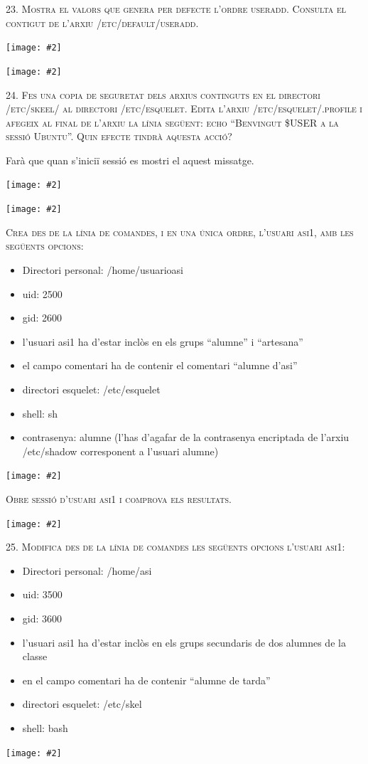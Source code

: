 \documentclass[a4paper,12pt]{article}
\newcommand{\mygraphic}[2][width=\textwidth]{\begin{center}
		\centering\texttt{[image: \#2]}\par
\end{center}}
\begin{document}
\newpage
\textsc{23. Mostra el valors que genera per defecte l’ordre useradd. Consulta el contigut de l’arxiu /etc/default/useradd. }
\mygraphic{imatges/23a.png}
\mygraphic{imatges/23b.png}

\newpage
\textsc{24. Fes una copia de seguretat dels arxius continguts en el directori /etc/skeel/ al directori /etc/esquelet. Edita l’arxiu \linebreak /etc/esquelet/.profile i afegeix al final de l’arxiu la línia següent: echo “Benvingut \$USER a la sessió Ubuntu”. Quin efecte tindrà aquesta acció?}

Farà que quan s'iniciï sessió es mostri el aquest missatge.

\mygraphic{imatges/24a.png}
\mygraphic{imatges/24b.png}


\textsc{Crea des de la línia de comandes, i en una única ordre, l’usuari asi1, amb les següents opcions:}

\begin{itemize}
\item Directori personal: /home/usuarioasi
\item uid: 2500
\item gid: 2600
\item l’usuari asi1 ha d’estar inclòs en els grups “alumne” i “artesana”
\item el campo comentari ha de contenir el comentari “alumne d’asi”
\item directori esquelet: /etc/esquelet
\item shell: sh
\item contrasenya: alumne (l’has d’agafar de la contrasenya encriptada de l’arxiu /etc/shadow corresponent a l’usuari alumne) 
\end{itemize}

\mygraphic{imatges/24c.png}

\newpage
\textsc{Obre sessió d’usuari asi1 i comprova els resultats.}
\mygraphic{imatges/24d.png}

\newpage
\textsc{25. Modifica des de la línia de comandes les següents opcions l’usuari asi1:}
\begin{itemize}
\item Directori personal: /home/asi
\item uid: 3500
\item gid: 3600
\item l’usuari asi1 ha d’estar inclòs en els grups secundaris de dos alumnes de la classe
\item en el campo comentari ha de contenir “alumne de tarda”
\item directori esquelet: /etc/skel
\item shell: bash
\end{itemize}
\mygraphic{imatges/25.png}
\end{document}
